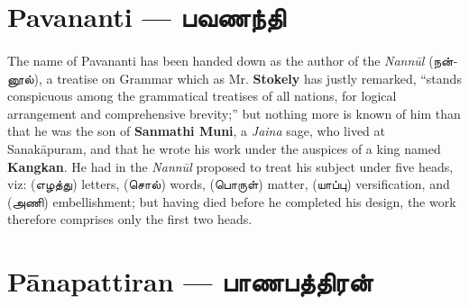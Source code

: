 \documentclass{article}
\newcommand{\TamilText}[1]{\texttamil{#1}}
\newcommand{\TamilBold}[1]{\texttamil{\textbf{#1}}}
\newcommand{\tam}[1]{\TamilText{#1}}
\newcommand{\tambold}[1]{\TamilBold{#1}}
\begin{document}
\section{Pavananti --- \tambold{பவணந்தி}}
\paragraph{}
The name of Pavananti has been handed down as the author of the \emph{Nann\={u}l} (\tam{நன்னூல்}), a treatise on Grammar which as Mr. \textbf{Stokely} has justly remarked, ``stands conspicuous among the grammatical treatises of all nations, for logical arrangement and comprehensive brevity;'' but nothing more is known of him than that he was the son of \textbf{Sanmathi Muni}, a \emph{Jaina} sage, who lived at Sanak\={a}puram, and that he wrote his work under the auspices of a king named \textbf{Kangkan}. He had in the \emph{Nann\={u}l} proposed to treat his subject under five heads, viz: (\tam{எழத்து}) letters, (\tam{சொல்}) words, (\tam{பொருள்}) matter, (\tam{யாப்பு}) versification, and (\tam{அணி}) embellishment; but having died before he completed his design, the work therefore comprises only the first two heads.

\section{P\={a}napattiran --- \tambold{பாணபத்திரன்}}
\end{document}
